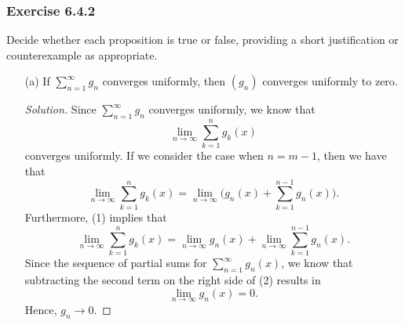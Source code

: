 \subsubsection{Exercise 6.4.2} Decide whether each proposition is true or false, providing a short justification or counterexample as appropriate.  

\begin{enumerate}
    \item[(a)] If \( \sum_{ n=1 }^{ \infty  } g_n  \) converges uniformly, then \( (g_n)  \) converges uniformly to zero.
        \begin{proof}[Solution]
         Since \( \sum_{ n=1 }^{ \infty  } g_n  \) converges uniformly, we know that 
        \[  \lim_{ n \to \infty  } \sum_{ k=1 }^{ n } g_k(x)  \]
        converges uniformly. If we consider the case when \( n = m - 1  \), then we have that 
        \[  \lim_{ n \to \infty  } \sum_{ k=1 }^{ n } g_k(x) = \lim_{ n \to \infty  } \Big( g_n(x) + \sum_{ k=1 }^{ n - 1  } g_n(x)  \Big)  \tag{1}. \]
        Furthermore, (1) implies that 
        \[  \lim_{ n \to \infty  }  \sum_{ k=1 }^{  n } g_k(x) = \lim_{ n \to \infty  }  g_n(x) + \lim_{ n \to \infty  } \sum_{ k=1 }^{ n-1 } g_n(x). \tag{2} \]
        Since the sequence of partial sums for \( \sum_{ n=1 }^{ \infty  } g_n(x)  \), we know that subtracting the second term on the right side of (2) results in 
        \[  \lim_{ n \to \infty  }  g_n(x) = 0. \]
        Hence, \( g_n \to 0  \).
        \end{proof}
        

\end{enumerate}
